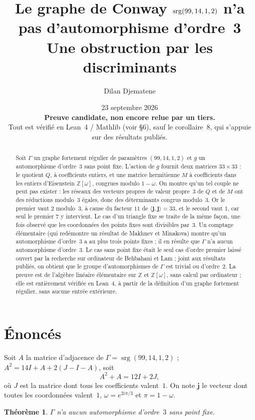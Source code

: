 \documentclass[11pt,a4paper]{article}
\title{Le graphe de Conway $\srg(99,14,1,2)$ n'a pas d'automorphisme d'ordre~3\\[3pt]
\large Une obstruction par les discriminants}
\author{Dilan Djematene}
\date{23 septembre 2026 \\[4pt]
\textcolor{red!60!black}{\textbf{Preuve candidate, non encore relue par un tiers.}}\\[2pt]
\small Tout est vérifié en Lean~4 / Mathlib (voir §6), sauf le corollaire~8, qui s'appuie sur des résultats publiés.}
\newtheorem{theorem}{Théorème}
\theoremstyle{remark}
\newcommand{\Z}{\mathbb{Z}}
\newcommand{\one}{\mathbf{j}}
\newcommand{\srg}{\operatorname{srg}}
\begin{document}
\maketitle

\begin{abstract}
Soit $\Gamma$ un graphe fortement régulier de paramètres $(99,14,1,2)$ et $g$ un automorphisme d'ordre~3 sans point fixe.
L'action de $g$ fournit deux matrices $33\times 33$ : le quotient $Q$, à coefficients entiers, et une matrice hermitienne $M$ à
coefficients dans les entiers d'Eisenstein $\Z[\omega]$, congrues modulo $1-\omega$. On montre qu'un tel couple ne peut pas exister :
les réseaux des vecteurs propres de valeur propre~$3$ de $Q$ et de $M$ ont des réductions modulo~3 égales, donc des
déterminants congrus modulo~3. Or le premier vaut $2$ modulo~3, à cause du facteur $11$ de $\langle\one,\one\rangle=33$,
et le second vaut $1$, car seul le premier $7$ y intervient. Le cas d'un triangle fixe se traite de la même façon, une fois
observé que les coordonnées des points fixes sont divisibles par~3.
Un comptage élémentaire (qui redémontre un résultat de Makhnev et Minakova) montre qu'un automorphisme d'ordre~3 a au plus trois
points fixes ; il en résulte que $\Gamma$ n'a aucun automorphisme d'ordre~3.
Le cas sans point fixe était le seul cas d'ordre premier laissé ouvert par la recherche sur ordinateur de Behbahani et Lam ;
joint aux résultats publiés, on obtient que le groupe d'automorphismes de $\Gamma$ est trivial ou d'ordre~2.
La preuve est de l'algèbre linéaire élémentaire sur $\Z$ et $\Z[\omega]$, sans calcul par ordinateur ; elle est entièrement
vérifiée en Lean~4, à partir de la définition d'un graphe fortement régulier, sans aucune entrée extérieure.
\end{abstract}

\section{Énoncés}

Soit $A$ la matrice d'adjacence de $\Gamma=\srg(99,14,1,2)$ ; $A^2=14I+A+2(J-I-A)$, soit
\begin{equation}\label{eq:srg}
A^2+A=12I+2J ,
\end{equation}
où $J$ est la matrice dont tous les coefficients valent~$1$. On note $\one$ le vecteur dont toutes les coordonnées valent~$1$,
$\omega=e^{2i\pi/3}$ et $\pi=1-\omega$.

\begin{theorem}\label{thm:libre}
$\Gamma$ n'a aucun automorphisme d'ordre~$3$ sans point fixe.
\end{theorem}
\end{document}

